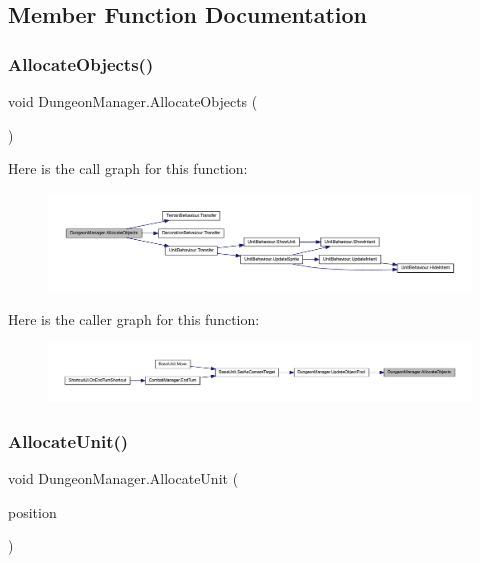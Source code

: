 \subsection{Member Function Documentation}
\mbox{\label{class_dungeon_manager_a196f2f6754dae0d38307197bbbf033c4}} 
\subsubsection{\texorpdfstring{AllocateObjects()}{AllocateObjects()}}
{\footnotesize\ttfamily void Dungeon\+Manager.\+Allocate\+Objects (\begin{DoxyParamCaption}{ }\end{DoxyParamCaption})}

Here is the call graph for this function\+:
\nopagebreak
\begin{figure}[H]
\begin{center}
\leavevmode
\includegraphics[width=350pt]{class_dungeon_manager_a196f2f6754dae0d38307197bbbf033c4_cgraph}
\end{center}
\end{figure}
Here is the caller graph for this function\+:
\nopagebreak
\begin{figure}[H]
\begin{center}
\leavevmode
\includegraphics[width=350pt]{class_dungeon_manager_a196f2f6754dae0d38307197bbbf033c4_icgraph}
\end{center}
\end{figure}
\mbox{\label{class_dungeon_manager_a384a7907b2dba3017c3b4870c089e3ff}} 
\subsubsection{\texorpdfstring{AllocateUnit()}{AllocateUnit()}}
{\footnotesize\ttfamily void Dungeon\+Manager.\+Allocate\+Unit (\begin{DoxyParamCaption}\item[{Vector2\+Int}]{position }\end{DoxyParamCaption})}

